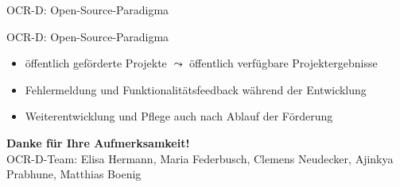 \documentclass{bbawslides}
\begin{document}
\begin{bbawslide}{OCR-D: Open-Source-Paradigma}
  \vspace*{2mm}%
  \begin{center}
  \end{center}
\end{bbawslide}

\begin{bbawslide}{OCR-D: Open-Source-Paradigma}
  \vspace*{7mm}%
  \centerslidestrue%
  \begin{itemize}
    \item öffentlich geförderte Projekte $\leadsto$ öffentlich verfügbare Projektergebnisse
    \item Fehlermeldung und Funktionalitätsfeedback während der Entwicklung
    \item Weiterentwicklung und Pflege auch nach Ablauf der Förderung
  \end{itemize}
\end{bbawslide}

\begin{bbawpart}{\Large\bf Danke für Ihre Aufmerksamkeit!\\}
OCR-D-Team: Elisa Hermann, Maria Federbusch, Clemens Neudecker, Ajinkya Prabhune, Matthias Boenig
\end{bbawpart}
\end{document}
